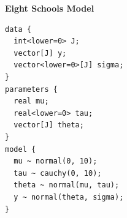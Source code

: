 \documentclass[11pt, oneside, openany]{scrbook}
\begin{document}
\textbf{Eight Schools Model}


\begin{verbatim}
data {
  int<lower=0> J;
  vector[J] y;
  vector<lower=0>[J] sigma;
}
parameters {
  real mu;
  real<lower=0> tau;
  vector[J] theta;
}
model {
  mu ~ normal(0, 10);
  tau ~ cauchy(0, 10);
  theta ~ normal(mu, tau);
  y ~ normal(theta, sigma);
}
\end{verbatim}


\backmatter

\end{document}
